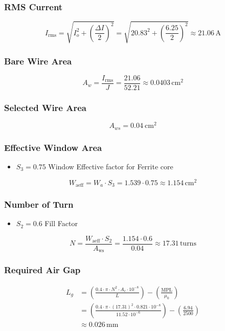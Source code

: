 \subsubsection*{RMS Current}
\begin{equation}
     I_{\text{rms}} = \sqrt{I_o^2 + \left(\frac{\Delta I}{2}\right)^2}
= \sqrt{20.83^2 + \left(\frac{6.25}{2}\right)^2}
\approx \boxed{21.06\,\text{A}}
\end{equation}
\subsubsection*{Bare Wire Area}
\begin{equation}
 A_w = \frac{I_{\text{rms}}}{J} 
= \frac{21.06}{52.21} 
\approx \boxed{0.0403\,\text{cm}^2}
\end{equation}
\subsubsection*{Selected Wire Area}
\[
A_{ws} = 0.04\ \text{cm}^2
\]
\subsubsection*{Effective Window Area}
\begin{itemize}
    \item $S_3 = 0.75$ Window Effective factor for Ferrite core
\end{itemize}
\begin{equation}
W_{\text{aeff}} = W_a \cdot S_3 
= 1.539 \cdot 0.75
\approx \boxed{1.154\,\text{cm}^2}
\end{equation}
\subsubsection*{Number of Turn}
\begin{itemize}
    \item $S_2 = 0.6$ Fill Factor 
\end{itemize}
\begin{equation}
N = \frac{W_{\text{aeff}} \cdot S_2}{A_{\text{ws}}} 
= \frac{1.154 \cdot 0.6}{0.04} 
\approx \boxed{17.31\,\text{turns}}  
\end{equation}

\subsubsection*{Required Air Gap}
\begin{align*}
    L_g &= \left( \frac{0.4 \cdot \pi \cdot N^2 \cdot A_c \cdot 10^{-8}}{L} \right) - \left( \frac{\text{MPL}}{\mu_0} \right) \\
&= \left( \frac{0.4 \cdot \pi \cdot (17.31)^2 \cdot 0.821 \cdot 10^{-8}}{11.52 \cdot 10^{-6}} \right) - \left( \frac{6.94}{2500} \right) \nonumber \\
&\approx \boxed{0.026\,\text{mm}}
\end{align*}


